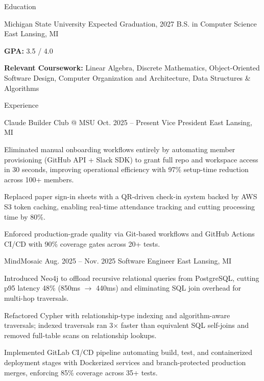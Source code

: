 \documentclass[
	11pt
]{../../../resume}
\begin{document}
	\begin{rSection}{E}{ducation}
		\begin{rSectionEntry}
			{Michigan State University}
			{Expected Graduation, 2027}
			{B.S. in Computer Science}
			{}
			{East Lansing, MI}

			\item \textbf{GPA:} 3.5 / 4.0
			\item \textbf{Relevant Coursework:} Linear Algebra, Discrete Mathematics, Object-Oriented Software Design, Computer Organization and Architecture, Data Structures \& Algorithms
		\end{rSectionEntry}
	\end{rSection}

	\begin{rSection}{E}{xperience}
		\begin{rSectionEntry}
			{Claude Builder Club @ MSU}
			{Oct. 2025 -- Present}
			{Vice President}
			{}
			{East Lansing, MI}

			\item Eliminated manual onboarding workflows entirely by automating member provisioning (GitHub API + Slack SDK) to grant full repo and workspace access in 30 seconds, improving operational efficiency with 97\% setup-time reduction across 100+ members.
			\item Replaced paper sign-in sheets with a QR-driven check-in system backed by AWS S3 token caching, enabling real-time attendance tracking and cutting processing time by 80\%.
			\item Enforced production-grade quality via Git-based workflows and GitHub Actions CI/CD with 90\% coverage gates across 20+ tests.
		\end{rSectionEntry}

		\begin{rSectionEntry}
			{MindMosaic}
			{Aug. 2025 -- Nov. 2025}
			{Software Engineer}
			{}
			{East Lansing, MI}

			\item Introduced Neo4j to offload recursive relational queries from PostgreSQL, cutting p95 latency 48\% (850ms $\rightarrow$ 440ms) and eliminating SQL join overhead for multi-hop traversals.
			\item Refactored Cypher with relationship-type indexing and algorithm-aware traversals; indexed traversals ran 3$\times$ faster than equivalent SQL self-joins and removed full-table scans on relationship lookups.
			\item Implemented GitLab CI/CD pipeline automating build, test, and containerized deployment stages with Dockerized services and branch-protected production merges, enforcing 85\% coverage across 35+ tests.
		\end{rSectionEntry}
	\end{rSection}
\end{document}
